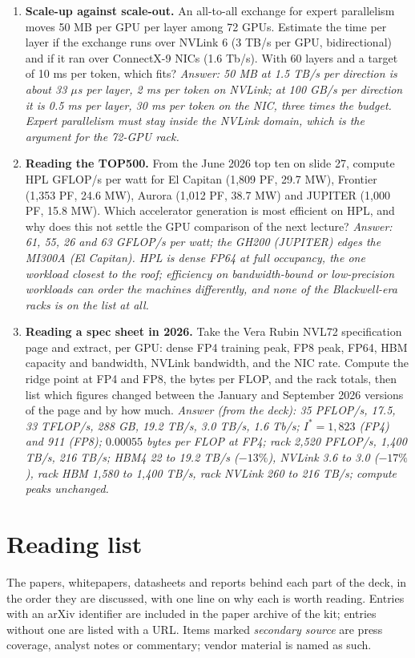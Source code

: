 \documentclass[11pt,letterpaper]{article}
\newcommand{\setstage}[1]{\colorlet{stagec}{#1}}
\begin{document}
\begin{enumerate}[leftmargin=1.6em,itemsep=6pt]
\item \textbf{Scale-up against scale-out.} An all-to-all exchange for expert parallelism moves 50 MB per GPU per layer among 72 GPUs. Estimate the time per layer if the exchange runs over NVLink 6 (3 TB/s per GPU, bidirectional) and if it ran over ConnectX-9 NICs (1.6 Tb/s). With 60 layers and a target of 10 ms per token, which fits? \emph{Answer: 50 MB at 1.5 TB/s per direction is about 33 $\mu$s per layer, 2 ms per token on NVLink; at 100 GB/s per direction it is 0.5 ms per layer, 30 ms per token on the NIC, three times the budget. Expert parallelism must stay inside the NVLink domain, which is the argument for the 72-GPU rack.}
\item \textbf{Reading the TOP500.} From the June 2026 top ten on slide 27, compute HPL GFLOP/s per watt for El Capitan (1,809 PF, 29.7 MW), Frontier (1,353 PF, 24.6 MW), Aurora (1,012 PF, 38.7 MW) and JUPITER (1,000 PF, 15.8 MW). Which accelerator generation is most efficient on HPL, and why does this not settle the GPU comparison of the next lecture? \emph{Answer: 61, 55, 26 and 63 GFLOP/s per watt; the GH200 (JUPITER) edges the MI300A (El Capitan). HPL is dense FP64 at full occupancy, the one workload closest to the roof; efficiency on bandwidth-bound or low-precision workloads can order the machines differently, and none of the Blackwell-era racks is on the list at all.}
\item \textbf{Reading a spec sheet in 2026.} Take the Vera Rubin NVL72 specification page and extract, per GPU: dense FP4 training peak, FP8 peak, FP64, HBM capacity and bandwidth, NVLink bandwidth, and the NIC rate. Compute the ridge point at FP4 and FP8, the bytes per FLOP, and the rack totals, then list which figures changed between the January and September 2026 versions of the page and by how much. \emph{Answer (from the deck): 35 PFLOP/s, 17.5, 33 TFLOP/s, 288 GB, 19.2 TB/s, 3.0 TB/s, 1.6 Tb/s; $I^\ast = 1{,}823$ (FP4) and 911 (FP8); $0.00055$ bytes per FLOP at FP4; rack 2{,}520 PFLOP/s, 1{,}400 TB/s, 216 TB/s; HBM4 22 to 19.2 TB/s ($-13\%$), NVLink 3.6 to 3.0 ($-17\%$), rack HBM 1{,}580 to 1{,}400 TB/s, rack NVLink 260 to 216 TB/s; compute peaks unchanged.}
\end{enumerate}
\clearpage
\setstage{ink}
\section{Reading list}
\label{app:reading}
The papers, whitepapers, datasheets and reports behind each part of the deck, in the order they are discussed, with one line on why each is worth reading. Entries with an arXiv identifier are included in the paper archive of the kit; entries without one are listed with a URL. Items marked \emph{secondary source} are press coverage, analyst notes or commentary; vendor material is named as such.
\end{document}
